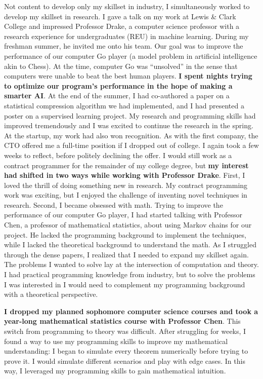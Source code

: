 \documentclass[12pt]{article}
\begin{document}
Not content to develop only my skillset in industry, I simultaneously worked to develop my skillset in research. I gave a talk on my work at Lewis \& Clark College and impressed Professor Drake, a computer science professor with a research experience for undergraduates (REU) in machine learning. During my freshman summer, he invited me onto his team. Our goal was to improve the performance of our computer Go player (a model problem in artificial intelligence akin to Chess). At the time, computer Go was ``unsolved'' in the sense that computers were unable to beat the best human players. \textbf{I spent nights trying to optimize our program's performance in the hope of making a smarter AI}. At the end of the summer, I had co-authored a paper on a statistical compression algorithm we had implemented, and I had presented a poster on a supervised learning project. My research and programming skills had improved tremendously and I was excited to continue the research in the spring. At the startup, my work had also won recognition. As with the first company, the CTO offered me a full-time position if I dropped out of college. I again took a few weeks to reflect, before politely declining the offer. I would still work as a contract programmer for the remainder of my college degree, but \textbf{my interest had shifted in two ways while working with Professor Drake}. First, I loved the thrill of doing something new in research. My contract programming work was exciting, but I enjoyed the challenge of inventing novel techniques in research. Second, I became obsessed with math. Trying to improve the performance of our computer Go player, I had started talking with Professor Chen, a professor of mathematical statistics, about using Markov chains for our project. He lacked the programming background to implement the techniques, while I lacked the theoretical background to understand the math. As I struggled through the dense papers, I realized that I needed to expand my skillset again. The problems I wanted to solve lay at the intersection of computation and theory. I had practical programming knowledge from industry, but to solve the problems I was interested in I would need to complement my programming background with a theoretical perspective.

\textbf{I dropped my planned sophomore computer science courses and took a year-long mathematical statistics course with Professor Chen}. This switch from  programming to theory was difficult. After struggling for weeks, I found a way to use my programming skills to improve my mathematical understanding: I began to simulate every theorem numerically before trying to prove it. I would simulate different scenarios and play with edge cases. In this way, I leveraged my programming skills to gain mathematical intuition.
\end{document}
